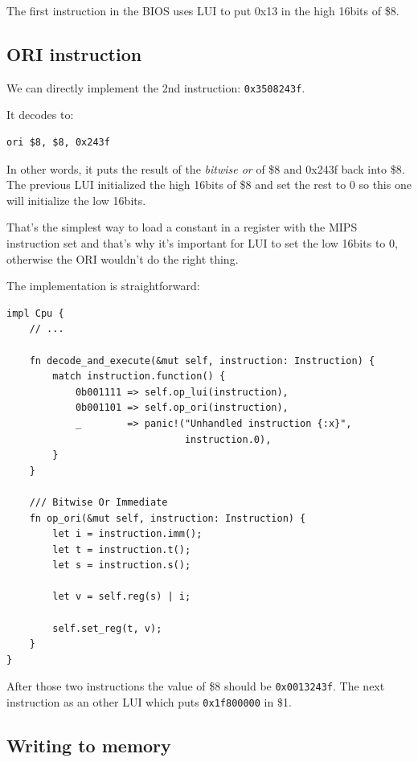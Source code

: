 \documentclass[a4paper]{article}
\newcommand{\code}[1] {\texttt{#1}}
\begin{document}
The first instruction in the BIOS uses LUI to put 0x13 in the high
16bits of \$8.

\subsection{ORI instruction}

We can directly implement the 2nd instruction: \code{0x3508243f}.

It decodes to:

\begin{lstlisting}[language=assembly]
ori $8, $8, 0x243f
\end{lstlisting}

In other words, it puts the result of the \emph{bitwise or} of \$8 and
0x243f back into \$8. The previous LUI initialized the high
16bits of \$8 and set the rest to 0 so this one will initialize the
low 16bits.

That's the simplest way to load a constant in a register with the MIPS
instruction set and that's why it's important for LUI to set the low
16bits to 0, otherwise the ORI wouldn't do the right thing.

The implementation is straightforward:

\begin{lstlisting}
impl Cpu {
    // ...

    fn decode_and_execute(&mut self, instruction: Instruction) {
        match instruction.function() {
            0b001111 => self.op_lui(instruction),
            0b001101 => self.op_ori(instruction),
            _        => panic!("Unhandled instruction {:x}",
                               instruction.0),
        }
    }

    /// Bitwise Or Immediate
    fn op_ori(&mut self, instruction: Instruction) {
        let i = instruction.imm();
        let t = instruction.t();
        let s = instruction.s();

        let v = self.reg(s) | i;

        self.set_reg(t, v);
    }
}
\end{lstlisting}

After those two instructions the value of \$8 should be
\code{0x0013243f}. The next instruction as an other LUI which puts
\code{0x1f800000} in \$1.

\subsection{Writing to memory}
\end{document}
